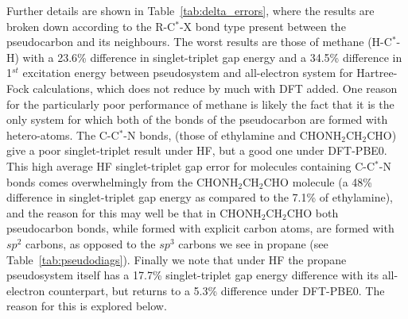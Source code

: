 \documentclass[aip,reprint,nofootinbib]{revtex4-1}
\begin{document}
Further details are shown in Table~\ref{tab:delta_errors}, where the results are broken down according to the R-C$^\ast$-X bond type present between the pseudocarbon and its neighbours. The worst results are those of methane (H-C$^\ast$-H) with a 23.6\% difference in singlet-triplet gap energy and a 34.5\% difference in 1$^{st}$ excitation energy between pseudosystem and all-electron system for Hartree-Fock calculations, which does not reduce by much with DFT added. One reason for the particularly poor performance of methane is likely the fact that it is the only system for which both of the bonds of the pseudocarbon are formed with hetero-atoms. The C-C$^\ast$-N bonds, (those of ethylamine and CHONH$_2$CH$_2$CHO) give a poor singlet-triplet result under HF, but a good one under DFT-PBE0. This high average HF singlet-triplet gap error for molecules containing C-C$^\ast$-N bonds comes overwhelmingly from the CHONH$_2$CH$_2$CHO molecule (a 48\% difference in singlet-triplet gap energy as compared to the 7.1\% of ethylamine), and the reason for this may well be that in CHONH$_2$CH$_2$CHO both pseudocarbon bonds, while formed with explicit carbon atoms, are formed with $sp^2$ carbons, as opposed to the $sp^3$ carbons we see in propane (see Table~\ref{tab:pseudodiags}). Finally we note that under HF the propane pseudosystem itself has a 17.7\% singlet-triplet gap energy difference with its all-electron counterpart, but returns to a 5.3\% difference under DFT-PBE0. The reason for this is explored below.
\end{document}
